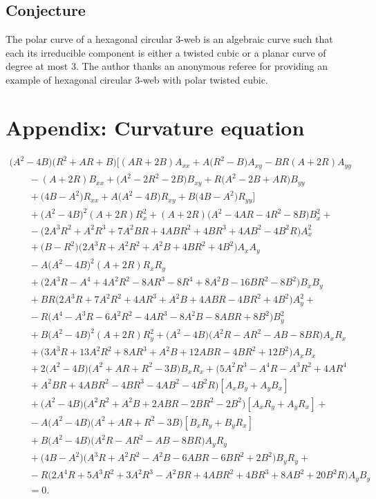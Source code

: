 \documentclass[pdftex]{sigma}
\numberwithin{equation}{section}
\begin{document}
\subsection{Conjecture}
The polar curve of a hexagonal circular 3-web is an algebraic curve such that
each its irreducible component is either a twisted cubic or a planar curve of degree at most 3. The author thanks an anonymous referee for providing an example of hexagonal circular 3-web with polar twisted cubic.

\appendix
\section{Appendix: Curvature equation}\label{AppendixA}
\begin{gather*}
\bigl(A^2 - 4B\bigr)\bigl(R^2 +AR+ B\bigr)\bigl[(AR + 2B)A_{xx}+A\bigl(R^2-B\bigr)A_{xy}-BR(A + 2R)A_{yy}
\\
\qquad{}-(A + 2R)B_{xx}+ \bigl(A^2-2R^2- 2B\bigr)B_{xy}+R\bigl(A^2 -2B+AR\bigr)B_{yy}
\\
\qquad{}+\bigl(4B-A^2\bigr)R_{xx}+A\bigl(A^2 - 4B\bigr)R_{xy}+B\bigl(4B-A^2\bigr)R_{yy}\bigr]
\\
\qquad{}+\bigl(A^2 - 4B\bigr)^2(A + 2R)R_x^2+(A + 2R)\bigl(A^2 - 4AR - 4R^2 - 8B\bigr)B_x^2+
\\
\qquad{} - \bigl(2A^3R^2 + A^2R^3 + 7A^2BR + 4ABR^2 + 4BR^3 + 4AB^2 - 4B^2R\bigr)A_x^2
\\
\qquad{}+\bigl(B-R^2\bigr)\bigl(2A^3R + A^2R^2 + A^2B + 4BR^2 + 4B^2\bigr)A_xA_y \\
\qquad{}- A\bigl(A^2 - 4B\bigr)^2(A + 2R)R_xR_y
\\
\qquad{}+\bigl( 2A^3R-A^4 + 4A^2R^2 - 8AR^3 - 8R^4 + 8A^2B - 16BR^2 - 8B^2\bigr)B_xB_y
 \\
\qquad{}+BR\bigl(2A^3R + 7A^2R^2 + 4AR^3 + A^2B + 4ABR - 4BR^2 + 4B^2\bigr)A_y^2+
 \\
\qquad{}-R\bigl(A^4 - A^3R - 6A^2R^2 - 4AR^3 - 8A^2B - 8ABR + 8B^2\bigr)B_y^2
 \\
\qquad{}+B\bigl(A^2 - 4B\bigr)^2(A + 2R)R_y^2 +\bigl(A^2 - 4B\bigr)\bigl(A^2R - AR^2 - AB - 8BR\bigr)A_xR_x
 \\
\qquad{}+\bigl(3A^3R + 13A^2R^2 + 8AR^3 + A^2B + 12ABR - 4BR^2 + 12B^2\bigr)A_xB_x
 \\
\qquad{}+2\bigl(A^2 - 4B\bigr)\bigl(A^2 + AR + R^2 - 3B\bigr)B_xR_x
+\bigl( 5A^2R^3-A^4R - A^3R^2 + 4AR^4 \\
\qquad{} + A^2BR+ 4ABR^2 - 4BR^3 - 4AB^2 - 4B^2R\bigr)[A_xB_y+A_yB_x]
 \\
\qquad{}+\bigl(A^2 - 4B\bigr)\bigl(A^2R^2 + A^2B + 2ABR - 2BR^2 - 2B^2\bigr)[A_xR_y+A_yR_x] +
 \\
\qquad{}-A\bigl(A^2 - 4B\bigr)\bigl(A^2 + AR + R^2 - 3B\bigr)[B_xR_y+B_yR_x]
 \\
\qquad{}+B\bigl(A^2 - 4B\bigr)\bigl(A^2R - AR^2 - AB - 8BR\bigr)A_yR_y
 \\
\qquad{}+\bigl(4B-A^2 \bigr)\bigl(A^3R + A^2R^2 - A^2B - 6ABR - 6BR^2 + 2B^2\bigr)B_yR_y+
 \\
\qquad{}-R\bigl(2A^4R + 5A^3R^2 + 3A^2R^3 - A^2BR + 4ABR^2 + 4BR^3 + 8AB^2 + 20B^2R\bigr)A_yB_y \\
\qquad{}=0.
\end{gather*}
\end{document}
